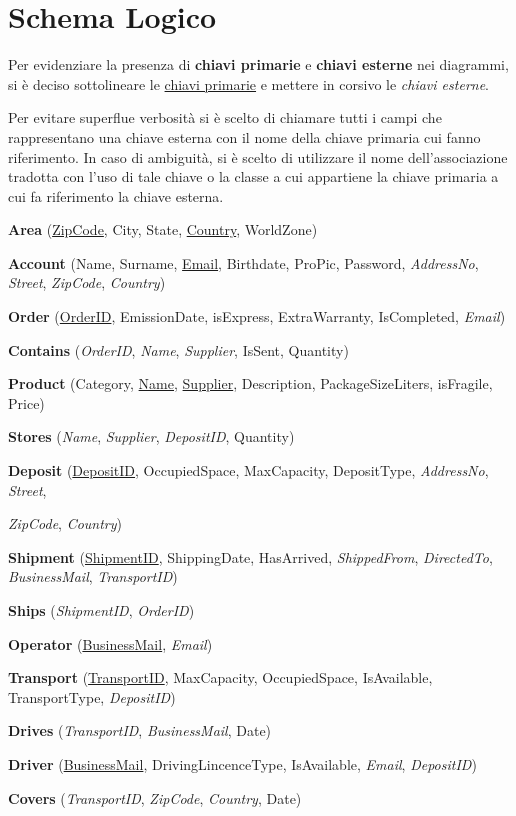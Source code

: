 \section{Schema Logico}

\begin{note}
  Per evidenziare la presenza di \textbf{chiavi primarie} e \textbf{chiavi esterne} nei diagrammi, si è deciso sottolineare le \underline{chiavi primarie} e mettere in corsivo le \textit{chiavi esterne}.

  Per evitare superflue verbosità si è scelto di chiamare tutti i campi che rappresentano una chiave esterna con il nome della chiave primaria cui fanno riferimento. In caso di ambiguità, si è scelto di utilizzare il nome dell'associazione tradotta con l'uso di tale chiave o la classe a cui appartiene la chiave primaria a cui fa riferimento la chiave esterna.
\end{note}


\textbf{Area} (\underline{ZipCode}, City, State, \underline{Country}, WorldZone) 

\textbf{Account} (Name, Surname, \underline{Email}, Birthdate, ProPic, Password, \textit{AddressNo}, \textit{Street}, \textit{ZipCode}, \textit{Country})

\textbf{Order} (\underline{OrderID}, EmissionDate, isExpress, ExtraWarranty, IsCompleted, \textit{Email})

\textbf{Contains} (\textit{OrderID}, \textit{Name}, \textit{Supplier}, IsSent, Quantity)

\textbf{Product} (Category, \underline{Name}, \underline{Supplier}, Description, PackageSizeLiters, isFragile, Price)

\textbf{Stores} (\textit{Name}, \textit{Supplier}, \textit{DepositID}, Quantity)

\textbf{Deposit} (\underline{DepositID}, OccupiedSpace, MaxCapacity, DepositType, \textit{AddressNo}, \textit{Street}, 

\textit{ZipCode}, \textit{Country})

\textbf{Shipment} (\underline{ShipmentID}, ShippingDate, HasArrived, \textit{ShippedFrom}, \textit{DirectedTo}, \textit{BusinessMail}, \textit{TransportID})

\textbf{Ships} (\textit{ShipmentID}, \textit{OrderID})

\textbf{Operator} (\underline{BusinessMail}, \textit{Email})

\textbf{Transport} (\underline{TransportID}, MaxCapacity, OccupiedSpace, IsAvailable, TransportType, \textit{DepositID}) 

\textbf{Drives} (\textit{TransportID}, \textit{BusinessMail}, Date)

\textbf{Driver} (\underline{BusinessMail}, DrivingLincenceType, IsAvailable, \textit{Email}, \textit{DepositID})

\textbf{Covers} (\textit{TransportID}, \textit{ZipCode}, \textit{Country}, Date)
